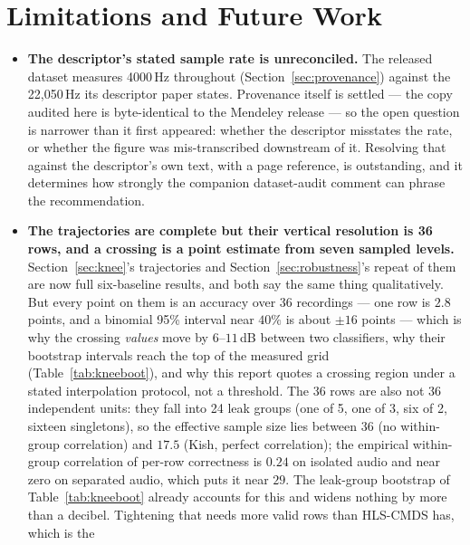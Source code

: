 \documentclass[11pt]{article}
\begin{document}
\section{Limitations and Future Work}
\label{sec:conclusion}

\begin{itemize}
  \item \textbf{The descriptor's stated sample rate is unreconciled.} The
    released dataset measures 4000\,Hz throughout
    (Section~\ref{sec:provenance}) against the 22{,}050\,Hz its descriptor
    paper states. Provenance itself is settled --- the copy audited here is
    byte-identical to the Mendeley release --- so the open question is
    narrower than it first appeared: whether the descriptor misstates the
    rate, or whether the figure was mis-transcribed downstream of it.
    Resolving that against the descriptor's own text, with a page reference,
    is outstanding, and it determines how strongly the companion
    dataset-audit comment can phrase the recommendation.
  \item \textbf{The trajectories are complete but their vertical
    resolution is 36 rows, and a crossing is a point estimate from seven
    sampled levels.} Section~\ref{sec:knee}'s trajectories and
    Section~\ref{sec:robustness}'s repeat of them are now full six-baseline
    results, and both say the same thing qualitatively. But every point on
    them is an accuracy over 36 recordings --- one row is $2.8$ points, and
    a binomial 95\% interval near $40\%$ is about $\pm16$ points --- which
    is why the crossing \emph{values} move by $6$--$11$\,dB between two
    classifiers, why their bootstrap intervals reach the top of the
    measured grid (Table~\ref{tab:kneeboot}), and why this report quotes a
    crossing region under a stated interpolation protocol, not a threshold.
    The 36 rows are also not 36 independent units: they fall into 24 leak
    groups (one of 5, one of 3, six of 2, sixteen singletons), so the
    effective sample size lies between 36 (no within-group correlation)
    and $17.5$ (Kish, perfect correlation); the empirical within-group
    correlation of per-row correctness is $0.24$ on isolated audio and
    near zero on separated audio, which puts it near $29$. The
    leak-group bootstrap of Table~\ref{tab:kneeboot} already accounts
    for this and widens nothing by more than a decibel.
    Tightening that needs more valid rows than HLS-CMDS has, which is the

\end{itemize}
\end{document}
